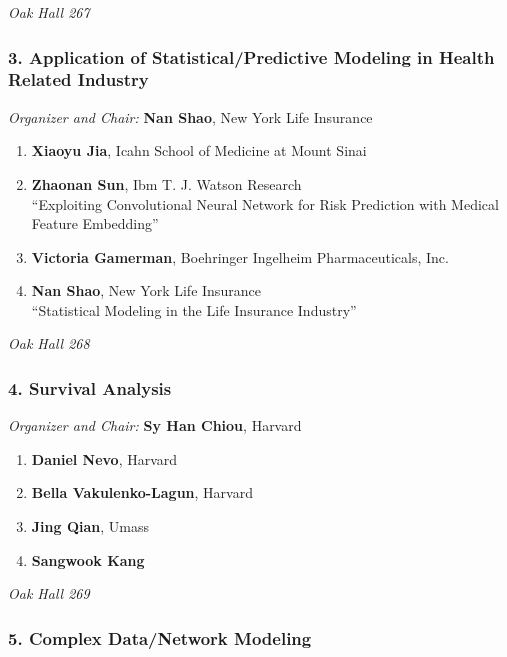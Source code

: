 \emph{Oak Hall 267} \\[.5em]

\subsubsection*{3. Application of Statistical/Predictive Modeling in Health Related Industry}

\emph{Organizer and Chair:} \textbf{Nan Shao}, New York Life Insurance

\begin{enumerate}
\item \textbf{Xiaoyu Jia}, Icahn School of Medicine at Mount Sinai 
\item \textbf{Zhaonan Sun}, Ibm T. J. Watson Research \\
``Exploiting Convolutional Neural Network for Risk Prediction with Medical Feature Embedding''
\item \textbf{Victoria Gamerman}, Boehringer Ingelheim Pharmaceuticals, Inc. 
\item \textbf{Nan Shao}, New York Life Insurance \\
``Statistical Modeling in the Life Insurance Industry''
\end{enumerate}

\emph{Oak Hall 268} \\[.5em]

\subsubsection*{4. Survival Analysis}

\emph{Organizer and Chair:} \textbf{Sy Han Chiou}, Harvard

\begin{enumerate}
\item \textbf{Daniel Nevo}, Harvard 
\item \textbf{Bella Vakulenko-Lagun}, Harvard 
\item \textbf{Jing Qian}, Umass 
\item \textbf{Sangwook Kang} 
\end{enumerate}

\emph{Oak Hall 269} \\[.5em]

\subsubsection*{5. Complex Data/Network Modeling}

